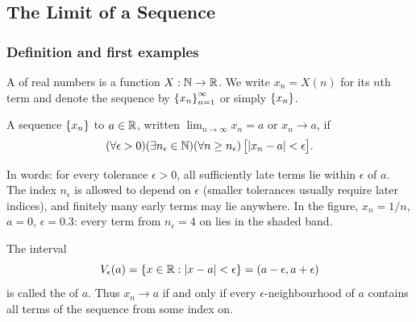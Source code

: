 \subsection{The Limit of a Sequence}

\subsubsection{Definition and first examples}
A  of real numbers is a function $X:\mathbb{N}\to\mathbb{R}$. We write
$x_n=X(n)$ for its $n$th term and denote the sequence by
$\left\{x_n\right\}_{n=1}^{\infty}$ or simply $\left\{x_n\right\}$.

\begin{definition}\label{def:limit}
    A sequence $\left\{x_n\right\}$  to $a\in\mathbb{R}$, written
    $\lim_{n\to\infty}x_n=a$ or $x_n\to a$, if
    \begin{equation*}
        (\forall \epsilon>0)(\exists n_\epsilon\in\mathbb{N})(\forall n\geq n_\epsilon)
        \,\bigl[\left|x_n-a\right|<\epsilon\bigr].
    \end{equation*}
\end{definition}

In words: for every tolerance $\epsilon>0$, all sufficiently late terms lie
within $\epsilon$ of $a$. The index $n_\epsilon$ is allowed to depend on
$\epsilon$ (smaller tolerances usually require later indices), and finitely
many early terms may lie anywhere. In the figure, $x_n=1/n$, $a=0$,
$\epsilon=0.3$: every term from $n_\epsilon=4$ on lies in the shaded band.

\begin{center}
\end{center}

The interval
\[
    V_\epsilon(a)=\left\{x\in\mathbb{R}:\left|x-a\right|<\epsilon\right\}=(a-\epsilon,a+\epsilon)
\]
is called the  of $a$. Thus $x_n\to a$ if and
only if every $\epsilon$-neighbourhood of $a$ contains all terms of the
sequence from some index on.

